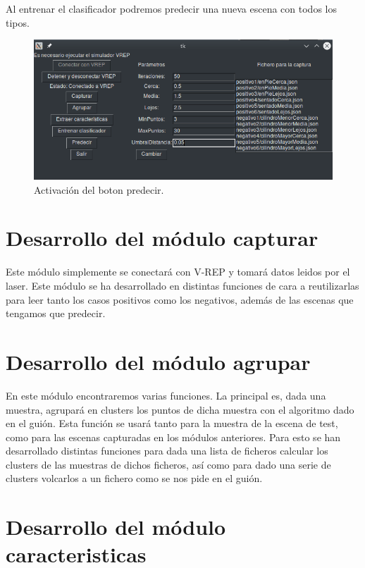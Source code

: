 \documentclass[12pt, spanish]{article}
\begin{document}
Al entrenar el clasificador podremos predecir una nueva escena con todos los tipos.

\begin{figure}[H]
    \centering
    \includegraphics[width=\textwidth]{boton_predecir.png}
    \caption{Activación del boton predecir.}
\end{figure}


\section{Desarrollo del módulo capturar}

Este módulo simplemente se conectará con V-REP y tomará datos leidos por el laser. Este módulo se ha desarrollado en distintas funciones de cara a reutilizarlas para leer tanto los casos positivos como los negativos, además de las escenas que tengamos que predecir.

\section{Desarrollo del módulo agrupar}

En este módulo encontraremos varias funciones. La principal es, dada una muestra, agrupará en clusters los puntos de dicha muestra con el algoritmo dado en el guión. Esta función se usará tanto para la muestra de la escena de test, como para las escenas capturadas en los módulos anteriores. Para esto se han desarrollado distintas funciones para dada una lista de ficheros calcular los clusters de las muestras de dichos ficheros, así como para dado una serie de clusters volcarlos a un fichero como se nos pide en el guión.

\section{Desarrollo del módulo caracteristicas}
\end{document}
